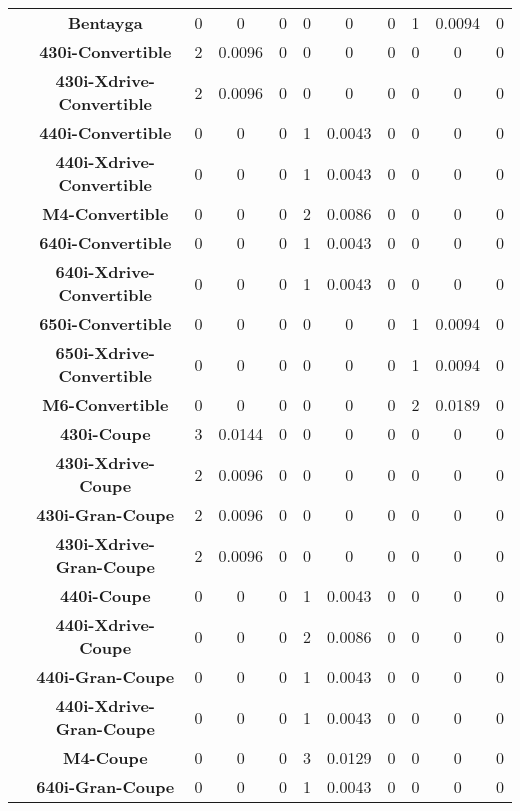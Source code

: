 \begin{center}
\begin{tabular}{|c|c||@{\hspace{1ex}}||c|c|c||@{\hspace{1ex}}||c|c|c||@{\hspace{1ex}}||c|c|c||@{\hspace{1ex}}||}
\cline{2-11}
  & {\bf Bentayga} & 0 & 0 & 0 & 0 & 0 & 0 & 1 & 0.0094 & 0 \\
\cline{2-11}
  & {\bf 430i-Convertible} & 2 & 0.0096 & 0 & 0 & 0 & 0 & 0 & 0 & 0 \\
\cline{2-11}
  & {\bf 430i-Xdrive-Convertible} & 2 & 0.0096 & 0 & 0 & 0 & 0 & 0 & 0 & 0 \\
\cline{2-11}
  & {\bf 440i-Convertible} & 0 & 0 & 0 & 1 & 0.0043 & 0 & 0 & 0 & 0 \\
\cline{2-11}
  & {\bf 440i-Xdrive-Convertible} & 0 & 0 & 0 & 1 & 0.0043 & 0 & 0 & 0 & 0 \\
\cline{2-11}
  & {\bf M4-Convertible} & 0 & 0 & 0 & 2 & 0.0086 & 0 & 0 & 0 & 0 \\
\cline{2-11}
  & {\bf 640i-Convertible} & 0 & 0 & 0 & 1 & 0.0043 & 0 & 0 & 0 & 0 \\
\cline{2-11}
  & {\bf 640i-Xdrive-Convertible} & 0 & 0 & 0 & 1 & 0.0043 & 0 & 0 & 0 & 0 \\
\cline{2-11}
  & {\bf 650i-Convertible} & 0 & 0 & 0 & 0 & 0 & 0 & 1 & 0.0094 & 0 \\
\cline{2-11}
  & {\bf 650i-Xdrive-Convertible} & 0 & 0 & 0 & 0 & 0 & 0 & 1 & 0.0094 & 0 \\
\cline{2-11}
  & {\bf M6-Convertible} & 0 & 0 & 0 & 0 & 0 & 0 & 2 & 0.0189 & 0 \\
\cline{2-11}
  & {\bf 430i-Coupe} & 3 & 0.0144 & 0 & 0 & 0 & 0 & 0 & 0 & 0 \\
\cline{2-11}
  & {\bf 430i-Xdrive-Coupe} & 2 & 0.0096 & 0 & 0 & 0 & 0 & 0 & 0 & 0 \\
\cline{2-11}
  & {\bf 430i-Gran-Coupe} & 2 & 0.0096 & 0 & 0 & 0 & 0 & 0 & 0 & 0 \\
\cline{2-11}
  & {\bf 430i-Xdrive-Gran-Coupe} & 2 & 0.0096 & 0 & 0 & 0 & 0 & 0 & 0 & 0 \\
\cline{2-11}
  & {\bf 440i-Coupe} & 0 & 0 & 0 & 1 & 0.0043 & 0 & 0 & 0 & 0 \\
\cline{2-11}
  & {\bf 440i-Xdrive-Coupe} & 0 & 0 & 0 & 2 & 0.0086 & 0 & 0 & 0 & 0 \\
\cline{2-11}
  & {\bf 440i-Gran-Coupe} & 0 & 0 & 0 & 1 & 0.0043 & 0 & 0 & 0 & 0 \\
\cline{2-11}
  & {\bf 440i-Xdrive-Gran-Coupe} & 0 & 0 & 0 & 1 & 0.0043 & 0 & 0 & 0 & 0 \\
\cline{2-11}
  & {\bf M4-Coupe} & 0 & 0 & 0 & 3 & 0.0129 & 0 & 0 & 0 & 0 \\
\cline{2-11}
  & {\bf 640i-Gran-Coupe} & 0 & 0 & 0 & 1 & 0.0043 & 0 & 0 & 0 & 0 \\

\end{tabular}
\end{center}
